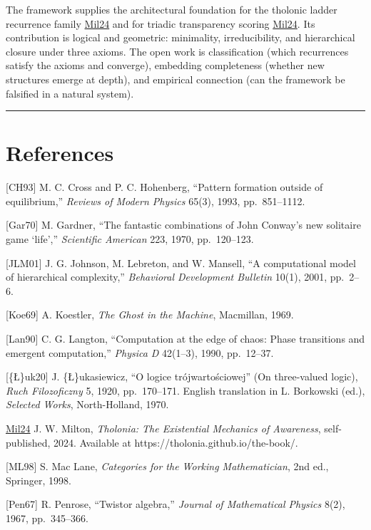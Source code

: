 \documentclass[12pt]{article}
\begin{document}
The framework supplies the architectural foundation for the tholonic
ladder recurrence family
\href{https://tholonia.github.io/the-book/}{Mil24} and for triadic
transparency scoring \href{https://tholonia.github.io/the-book/}{Mil24}.
Its contribution is logical and geometric: minimality, irreducibility,
and hierarchical closure under three axioms. The open work is
classification (which recurrences satisfy the axioms and converge),
embedding completeness (whether new structures emerge at depth), and
empirical connection (can the framework be falsified in a natural
system).

\begin{center}\rule{0.5\linewidth}{0.5pt}\end{center}

\section{References}\label{references}

{[}CH93{]} M. C. Cross and P. C. Hohenberg, ``Pattern formation outside
of equilibrium,'' \emph{Reviews of Modern Physics} 65(3), 1993,
pp.~851--1112.

{[}Gar70{]} M. Gardner, ``The fantastic combinations of John Conway's
new solitaire game `life','' \emph{Scientific American} 223, 1970,
pp.~120--123.

{[}JLM01{]} J. G. Johnson, M. Lebreton, and W. Mansell, ``A
computational model of hierarchical complexity,'' \emph{Behavioral
Development Bulletin} 10(1), 2001, pp.~2--6.

{[}Koe69{]} A. Koestler, \emph{The Ghost in the Machine}, Macmillan,
1969.

{[}Lan90{]} C. G. Langton, ``Computation at the edge of chaos: Phase
transitions and emergent computation,'' \emph{Physica D} 42(1--3), 1990,
pp.~12--37.

{[}\{\L\}uk20{]} J. \{\L\}ukasiewicz, ``O logice trójwartościowej'' (On
three-valued logic), \emph{Ruch Filozoficzny} 5, 1920, pp.~170--171.
English translation in L. Borkowski (ed.), \emph{Selected Works},
North-Holland, 1970.

\href{https://tholonia.github.io/the-book/}{Mil24} J. W. Milton,
\emph{Tholonia: The Existential Mechanics of Awareness}, self-published,
2024. Available at https://tholonia.github.io/the-book/.

{[}ML98{]} S. Mac Lane, \emph{Categories for the Working Mathematician},
2nd ed., Springer, 1998.

{[}Pen67{]} R. Penrose, ``Twistor algebra,'' \emph{Journal of
Mathematical Physics} 8(2), 1967, pp.~345--366.
\end{document}
